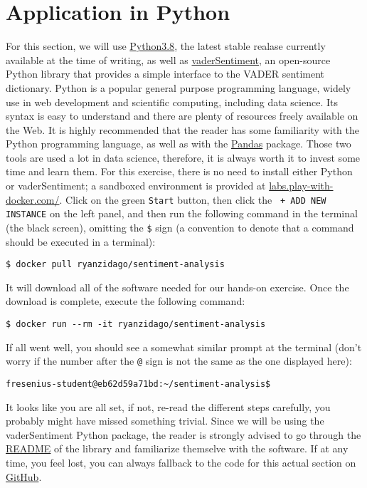	\section{Application in Python}\label{sec:applicationsinR}
	For this section, we will use \href{https://www.python.org/}{Python3.8}, the latest stable realase currently available at the time of writing, as well as \href{https://github.com/cjhutto/vaderSentiment}{vaderSentiment}, an open-source Python library that provides a simple interface to the VADER sentiment dictionary. Python is a popular general purpose programming language, widely use in web development and scientific computing, including data science. Its syntax is easy to understand and there are plenty of resources freely available on the Web. It is highly recommended that the reader has some familiarity with the Python programming language, as well as with the \href{https://pandas.pydata.org/}{Pandas} package. Those two tools are used a lot in data science, therefore, it is always worth it to invest some time and learn them. For this exercise, there is no need to install either Python or vaderSentiment; a sandboxed environment is provided at \href{https://labs.play-with-docker.com/#}{labs.play-with-docker.com/}. Click on the green \verb#Start# button, then click the \verb# + ADD NEW INSTANCE# on the left panel, and then run the following command in the terminal (the black screen), omitting the \verb#$# sign (a convention to denote that a command should be executed in a terminal): 
	\begin{Verbatim}
$ docker pull ryanzidago/sentiment-analysis
	\end{Verbatim}
	It will download all of the software needed for our hands-on exercise. Once the download is complete, execute the following command:
	\begin{Verbatim}
$ docker run --rm -it ryanzidago/sentiment-analysis
	\end{Verbatim}
	If all went well, you should see a somewhat similar prompt at the terminal (don't worry if the number after the \verb#@# sign is not the same as the one displayed here):
	\begin{Verbatim}
fresenius-student@eb62d59a71bd:~/sentiment-analysis$
	\end{Verbatim}
	
	It looks like you are all set, if not, re-read the different steps carefully, you probably might have missed something trivial. Since we will be using the vaderSentiment Python package, the reader is strongly advised to go through the \href{https://github.com/cjhutto/vaderSentiment#vader-sentiment-analysis}{README} of the library and familiarize themselve with the software. If at any time, you feel lost, you can always fallback to the code for this actual section on \href{https://gist.github.com/ryanzidago/5440bcd66be55ba23ca9b55cf336bab6}{GitHub}.
	
